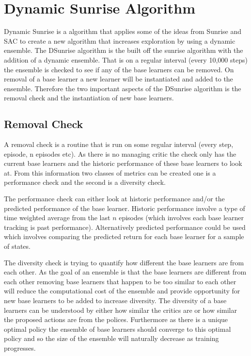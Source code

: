 \chapter{Dynamic Sunrise Algorithm}

Dynamic Sunrise is a algorithm that applies some of the ideas from Sunrise \cite{leeSUNRISESimpleUnified2021} and SAC \cite{haarnojaSoftActorCriticAlgorithms2019} to create a new algorithm that increases exploration by using a dynamic ensemble. The DSunrise algorithm is the built off the sunrise algorithm with the addition of a dynamic ensemble. That is on a regular interval (every 10,000 steps) the ensemble is checked to see if any of the base learners can be removed. On removal of a base learner a new learner will be instantiated and added to the ensemble. Therefore the two important aspects of the DSunrise algorithm is the removal check and the instantiation of new base learners.

\section{Removal Check}
\label{sec:removal_check}

A removal check is a routine that is run on some regular interval (every step, episode, n episodes etc). As there is no managing critic the check only has the current base learners and the historic performance of these base learners to look at. From this information two classes of metrics can be created one is a performance check and the second is a diversity check.

The performance check can either look at historic performance and/or the predicted performance of the base learner. Historic performance involve a type of time weighted average from the last $n$ episodes (which involves each base learner tracking is past performance). Alternatively predicted performance could be used which involves comparing the predicted return for each base learner for a sample of states.

The diversity check is trying to quantify how different the base learners are from each other. As the goal of an ensemble is that the base learners are different from each other removing base learners that happen to be too similar to each other will reduce the computational cost of the ensemble and provide opportunity for new base learners to be added to increase diversity. The diversity of a base learners can be understood by either how similar the critics are or how similar the proposed actions are from the polices. Furthermore as there is a unique optimal policy the ensemble of base learners should converge to this optimal policy and so the size of the ensemble will naturally decrease as training progresses.

